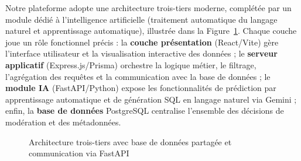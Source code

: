 \documentclass[10pt,twocolumn,a4paper]{article}
\begin{document}
Notre plateforme adopte une architecture trois-tiers moderne, complétée par un module dédié à l'intelligence artificielle (traitement automatique du langage naturel et apprentissage automatique), illustrée dans la Figure~\ref{fig:architecture_shared_db}. Chaque couche joue un rôle fonctionnel précis : la \textbf{couche présentation} (React/Vite) gère l'interface utilisateur et la visualisation interactive des données ; le \textbf{serveur applicatif} (Express.js/Prisma) orchestre la logique métier, le filtrage, l'agrégation des requêtes et la communication avec la base de données ; le \textbf{module IA} (FastAPI/Python) expose les fonctionnalités de prédiction par apprentissage automatique et de génération SQL en langage naturel via Gemini ; enfin, la \textbf{base de données} PostgreSQL centralise l'ensemble des décisions de modération et des métadonnées.

\begin{figure}[H]
\centering
{}
\caption{Architecture trois-tiers avec base de données partagée et communication via FastAPI}
\label{fig:architecture_shared_db}
\end{figure}
\end{document}
